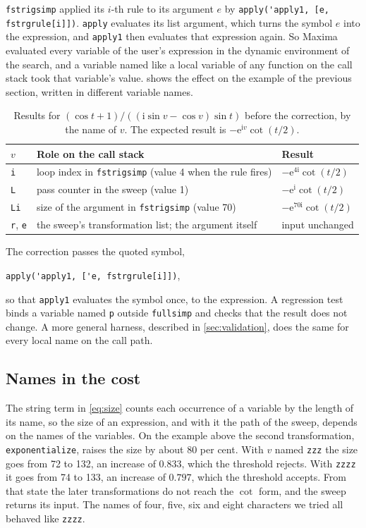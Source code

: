 \documentclass[11pt]{amsart}
\newcommand{\mx}{\lstinline[style=mx]}
\theoremstyle{definition}
\theoremstyle{remark}
\begin{document}
\mx|fstrigsimp| applied its $i$-th rule to its argument $e$ by
\mx|apply('apply1, [e, fstrgrule[i]])|. \mx|apply| evaluates its list
argument, which turns the symbol $e$ into the expression, and \mx|apply1|
then evaluates that expression again. So Maxima evaluated every variable of
the user's expression in the dynamic environment of the search, and a
variable named like a local variable of any function on the call stack took
that variable's value.  shows the effect on the example of
the previous section, written in different variable names.

\begin{table}[ht]
\caption{Results for $(\cos t+1)/((\mathrm{i}\sin v-\cos v)\sin t)$ before
the correction, by the name of $v$. The expected result is
$-\mathrm{e}^{\mathrm{i}v}\cot(t/2)$.}
\label{tab:collisions}
\small
\begin{tabular}{@{}lll@{}}
\toprule
$v$ & Role on the call stack & Result \\
\midrule
\mx|i| & loop index in \mx|fstrigsimp| (value 4 when the rule fires) & $-\mathrm{e}^{4\mathrm{i}}\cot(t/2)$ \\
\mx|L| & pass counter in the sweep (value 1) & $-\mathrm{e}^{\mathrm{i}}\cot(t/2)$ \\
\mx|Li| & size of the argument in \mx|fstrigsimp| (value 70) & $-\mathrm{e}^{70\mathrm{i}}\cot(t/2)$ \\
\mx|r|, \mx|e| & the sweep's transformation list; the argument itself & input unchanged \\
\bottomrule
\end{tabular}
\end{table}

The correction passes the quoted symbol,
\begin{center}
\mx|apply('apply1, ['e, fstrgrule[i]])|,
\end{center}
so that \mx|apply1| evaluates the symbol once, to the expression. A regression
test binds a variable named \mx|p| outside \mx|fullsimp| and checks that the
result does not change. A more general harness, described in
\cref{sec:validation}, does the same for every local name on the call path.

\subsection{Names in the cost}\label{sec:names}

The string term in \eqref{eq:size} counts each occurrence of a variable by
the length of its name, so the size of an expression, and with it the path
of the sweep, depends on the names of the variables. On the example above
the second transformation, \mx|exponentialize|, raises the size by about
80 per cent. With $v$ named \mx|zzz| the size goes from 72 to 132, an increase of
$0.833$, which the threshold rejects. With \mx|zzzz| it goes from 74 to 133,
an increase of $0.797$, which the threshold accepts. From that state the
later transformations do not reach the $\cot$ form, and the sweep returns
its input. The names of four, five, six and eight characters we tried all
behaved like \mx|zzzz|.
\end{document}
